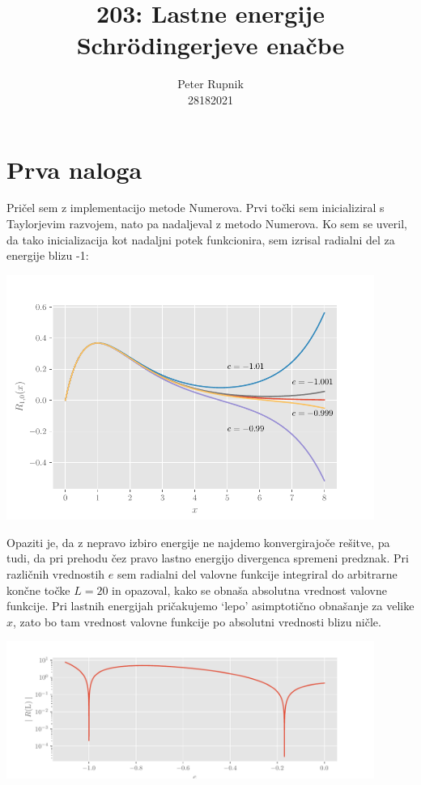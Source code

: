 \documentclass[a4paper,oneside,12pt]{article}
\title{203: Lastne energije Schr\"{o}dingerjeve enačbe}
\author{Peter Rupnik\\28182021}
\begin{document}
\maketitle

\section{Prva naloga}
Pričel sem z implementacijo metode Numerova. Prvi točki sem inicializiral s Taylorjevim razvojem, nato pa nadaljeval z metodo Numerova. Ko sem se uveril, da tako inicializacija kot nadaljni potek funkcionira, sem izrisal radialni del za energije blizu -1:
\begin{center}
     \includegraphics[width=0.9\textwidth]{../old/1-R10.pdf}
\end{center}
Opaziti je, da z nepravo izbiro energije ne najdemo konvergirajoče rešitve, pa tudi, da pri prehodu čez pravo lastno energijo divergenca spremeni predznak. Pri različnih vrednostih $e$ sem radialni del valovne funkcije integriral do arbitrarne končne točke $L=20$ in opazoval, kako se obnaša absolutna vrednost valovne funkcije. Pri lastnih energijah pričakujemo `lepo' asimptotično obnašanje za velike $x$, zato bo tam vrednost valovne funkcije po absolutni vrednosti blizu ničle.
\begin{center}
     \includegraphics[width=0.9\textwidth]{../old/1-absolutne.pdf}
\end{center}
\end{document}
